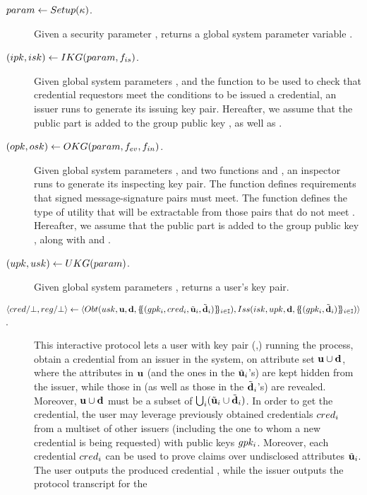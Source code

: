 \begin{description}
\item[$param \gets Setup(\kappa)$.] Given a security parameter \secpar,
  returns a global system parameter variable \parm.
\item[$(ipk,isk) \gets IKG(param,f_{is})$.] Given global system
  parameters \parm, and the function \fissue to be used to check that credential
  requestors meet the conditions to be issued a credential, an issuer runs
  \IKeyGen to generate its issuing key pair. Hereafter, we assume that the
  public part \ipk is added to the group public key \gpk, as well as \fissue.
\item[$(opk,osk) \gets OKG(param,f_{ev},f_{in})$.] Given global system
  parameters \parm, and two functions \feval and \finsp, an inspector runs
  \OKeyGen to generate its inspecting key pair. The function \feval defines
  requirements that signed message-signature pairs must meet. The function
  \finsp defines the type of utility that will be extractable from those pairs
  that do not meet \feval. Hereafter, we assume that the public part \opk is
  added to the group public key \gpk, along with \feval and \finsp.
\item[$(upk,usk) \gets UKG(param)$.] Given global system parameters
  \parm, returns a user's key pair.
\item[$\langle cred/\bot,reg/\bot \rangle \gets
  \langle
  Obt(usk,\mathbf{u},\mathbf{d},
  \{\mskip-5mu\{ (gpk_i,cred_i,\tilde{\mathbf{u}}_i,\tilde{\mathbf{d}}_i)\}\mskip-5mu\}_{i \in \mathbb{I}}),
  Iss(isk,upk,\mathbf{d},
  \{\mskip-5mu\{ (gpk_i,\tilde{\mathbf{d}}_i)\}\mskip-5mu\}_{i \in \mathbb{I}})
  \rangle$.] %
  This interactive protocol lets a user with key pair (\upk,\usk) running the
  \Obtain process, obtain a credential \cred from an issuer in the system, on
  attribute set $\mathbf{u} \cup \mathbf{d}$, where the attributes in $\mathbf{u}$ (and
  the ones in the $\tilde{\mathbf{u}}_i$'s) are kept hidden from the issuer, while those
  in \dattrs (as well as those in the $\tilde{\mathbf{d}}_i$'s) are revealed. Moreover,
  $\mathbf{u} \cup \mathbf{d}$ must be a subset of $\bigcup_i (\tilde{\mathbf{u}}_i \cup
  \tilde{\mathbf{d}}_i)$. In order to get the credential, the user may leverage previously
  obtained credentials $cred_i$ from a multiset of other issuers (including the
  one to whom a new credential is being requested) with public keys $gpk_i$.
  Moreover, each credential $cred_i$ can be used to prove claims over
  undisclosed attributes $\tilde{\mathbf{u}}_i$. The user outputs the produced credential
  \cred, while the issuer outputs the protocol transcript \utrans for the

\end{description}
